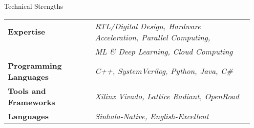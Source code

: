 \documentclass[
	11pt, %
]{./assets/resume} %
\begin{document}
	




\begin{rSection}{Technical Strengths}

	\def\arraystretch{1.5}

	\begin{tabular}{ l l}
		\textbf{Expertise} & \emph{RTL/Digital Design, Hardware Acceleration, Parallel Computing,} \\ 
		& \emph{ML \& Deep Learning, Cloud Computing} \\
		\textbf{Programming Languages} & \emph{C++, SystemVerilog, Python, Java, C\#} \\
		\textbf{Tools and Frameworks} & \emph{Xilinx Vivado, Lattice Radiant, OpenRoad} \\ 
		\textbf{Languages} & \emph{Sinhala-Native, English-Excellent} \\
	\end{tabular}

\end{rSection}
\end{document}
